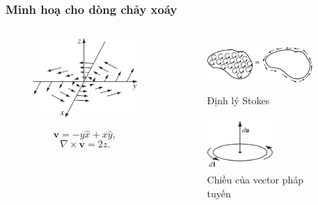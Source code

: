 \begin{frame}
    \frametitle{Minh hoạ cho dòng chảy xoáy}
    \begin{columns}
        \begin{column}{0.5\textwidth}
            \begin{figure}
                \centering
                \includegraphics[width=4cm, height=3cm]{Content/Figure/illustration for curl.jpg}
            \end{figure}
            \[\mathbf{v}=-y\hat{x}+x\hat{y},\]
            \[\nabla\times\mathbf{v}=2\hat{z}.\]
        \end{column}
        \begin{column}{0.5\textwidth}
            \begin{figure}
                \centering
                \includegraphics[width=4cm, height=2cm]{Content/Figure/illustration for Stoke.jpg}
                \caption{Định lý Stokes}
            \end{figure}
            \vspace{-8pt}

            \begin{figure}
                \centering
                \includegraphics[width=2.5cm, height=2cm]{Content/Figure/direction_of_normal_vector.jpg}
                \caption{Chiều của vector pháp tuyến}
            \end{figure}
        \end{column}
    \end{columns}
\end{frame}
